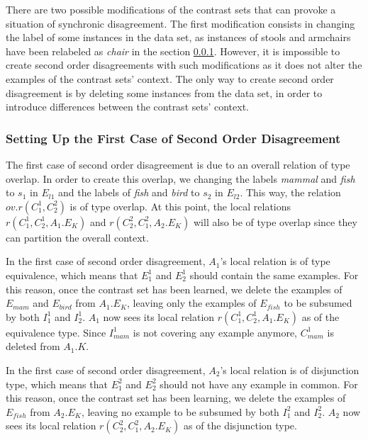 There are two possible modifications of the contrast sets that can provoke a situation of synchronic disagreement. The first modification consists in changing the label of some instances in the data set, as instances of stools and armchairs have been relabeled as \emph{chair} in the section \ref{}. However, it is impossible to create second order disagreements with such modifications as it does not alter the examples of the contrast sets' context. The only way to create second order disagreement is by deleting some instances from the data set, in order to introduce differences between the contrast sets' context.

\subsubsection{Setting Up the First Case of Second Order Disagreement}

The first case of second order disagreement is due to an overall relation of type overlap. In order to create this overlap, we changing the labels \emph{mammal} and \emph{fish} to $s_{1}$ in $E_{l1}$ and the labels of \emph{fish} and \emph{bird} to $s_{2}$ in $E_{l2}$. This way, the relation $ov.r(C_{1}^{1}, C_{2}^{2})$ is of type overlap. At this point, the local relations $r(C_{1}^{1},C_{2}^{1},A_{1}.E_{K})$ and $r(C_{2}^{2},C_{1}^{2},A_{2}.E_{K})$ will also be of type overlap since they can partition the overall context.

In the first case of second order disagreement, $A_{1}$'s local relation is of type equivalence, which means that $E_{1}^{1}$ and $E_{2}^{1}$ should contain the same examples. For this reason, once the contrast set has been learned, we delete the examples of $E_{mam}$ and $E_{bird}$ from $A_{1}.E_{K}$, leaving only the examples of $E_{fish}$ to be subsumed by both $I_{1}^{1}$ and $I_{2}^{1}$. $A_{1}$ now sees its local relation $r(C_{1}^{1},C_{2}^{1},A_{1}.E_{K})$ as of the equivalence type. Since $I_{mam}^{1}$ is not covering any example anymore, $C_{mam}^{1}$ is deleted from $A_{1}.K$.

In the first case of second order disagreement, $A_{2}$'s local relation is of disjunction type, which means that $E_{1}^{2}$ and $E_{2}^{2}$ should not have any example in common. For this reason, once the contrast set has been learning, we delete the examples of $E_{fish}$ from $A_{2}.E_{K}$, leaving no example to be subsumed by both $I_{1}^{2}$ and $I_{2}^{2}$. $A_{2}$ now sees its local relation $r(C_{2}^{2},C_{1}^{2},A_{2}.E_{K})$ as of the disjunction type.

